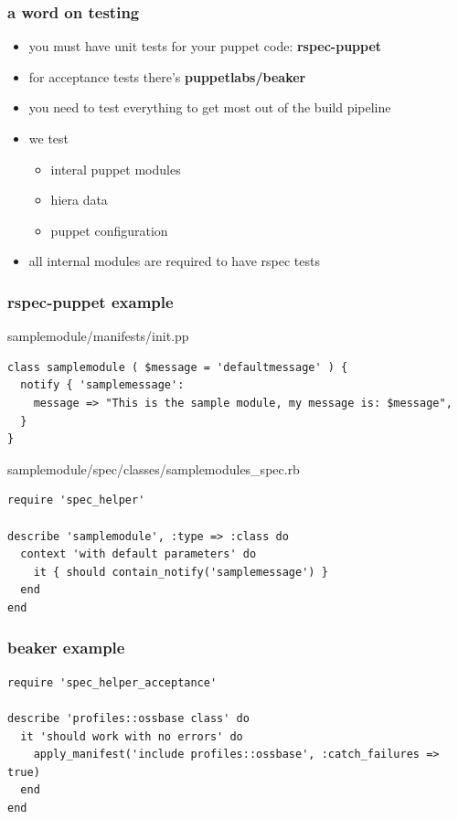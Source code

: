 \documentclass{beamer}
\begin{document}
\begin{frame}
  \frametitle{a word on testing}

  \begin{itemize}
  \item you must have unit tests for your puppet code: \textbf{rspec-puppet}
  \item for acceptance tests there's \textbf{puppetlabs/beaker}
  \item you need to test everything to get most out of the build
    pipeline
  \item we test
    \begin{itemize}
    \item interal puppet modules
    \item hiera data
    \item puppet configuration
    \end{itemize}
    \item all internal modules are required to have rspec tests
  \end{itemize}
\end{frame}

\begin{frame}
  \frametitle{rspec-puppet example}

  samplemodule/manifests/init.pp

\begin{lstlisting}
class samplemodule ( $message = 'defaultmessage' ) {
  notify { 'samplemessage':
    message => "This is the sample module, my message is: $message",
  }
}
\end{lstlisting}

  samplemodule/spec/classes/samplemodules\_spec.rb

  \begin{lstlisting}
require 'spec_helper'

describe 'samplemodule', :type => :class do
  context 'with default parameters' do
    it { should contain_notify('samplemessage') }
  end
end
  \end{lstlisting}

\end{frame}

\begin{frame}[fragile]
  \frametitle{beaker example}

\begin{lstlisting}
require 'spec_helper_acceptance'

describe 'profiles::ossbase class' do
  it 'should work with no errors' do
    apply_manifest('include profiles::ossbase', :catch_failures => true)
  end
end
\end{lstlisting}

\end{frame}
\end{document}
